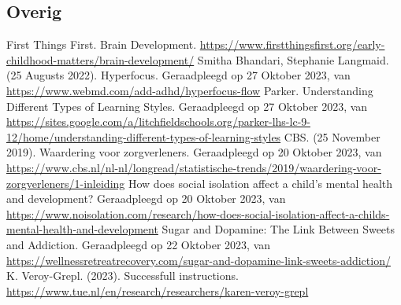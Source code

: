 \documentclass{article}
\begin{document}
\begin{thebibliography}{9}
        \item[\bigskip\subsection*{Overig}]
                First Things First. Brain Development. \url{https://www.firstthingsfirst.org/early-childhood-matters/brain-development/}
                Smitha Bhandari, Stephanie Langmaid. (25 Augusts 2022). Hyperfocus. Geraadpleegd op 27 Oktober 2023, van \url{https://www.webmd.com/add-adhd/hyperfocus-flow}
                Parker. Understanding Different Types of Learning Styles. Geraadpleegd op 27 Oktober 2023, van \url{https://sites.google.com/a/litchfieldschools.org/parker-lhs-lc-9-12/home/understanding-different-types-of-learning-styles}
                CBS. (25 November 2019). Waardering voor zorgverleners. Geraadpleegd op 20 Oktober 2023, van \url{https://www.cbs.nl/nl-nl/longread/statistische-trends/2019/waardering-voor-zorgverleners/1-inleiding}
                How does social isolation affect a child’s mental health and development? Geraadpleegd op 20 Oktober 2023, van \url{https://www.noisolation.com/research/how-does-social-isolation-affect-a-childs-mental-health-and-development}
                Sugar and Dopamine: The Link Between Sweets and Addiction. Geraadpleegd op 22 Oktober 2023, van \url{https://wellnessretreatrecovery.com/sugar-and-dopamine-link-sweets-addiction/}
                K. Veroy-Grepl. (2023). Successfull instructions. \url{https://www.tue.nl/en/research/researchers/karen-veroy-grepl}
    \end{thebibliography}

\end{document}
